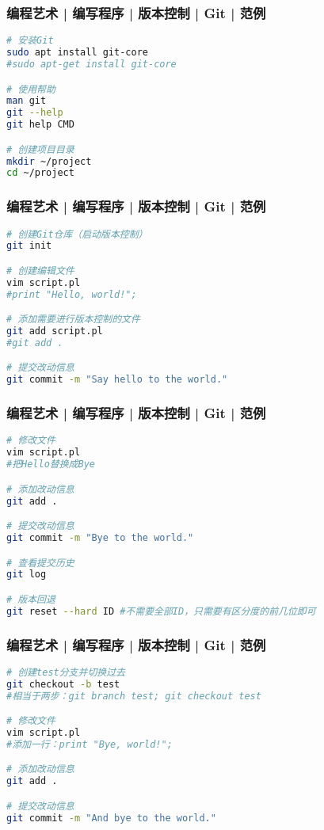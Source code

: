 \begin{frame}[fragile]
  \frametitle{编程艺术 | 编写程序 | 版本控制 | Git | \alert{范例}}
\begin{lstlisting}[language=sh]
# 安装Git
sudo apt install git-core
#sudo apt-get install git-core

# 使用帮助
man git
git --help
git help CMD

# 创建项目目录
mkdir ~/project
cd ~/project
\end{lstlisting}
\end{frame}

\begin{frame}[fragile]
  \frametitle{编程艺术 | 编写程序 | 版本控制 | Git | \alert{范例}}
\begin{lstlisting}[language=sh]
# 创建Git仓库（启动版本控制）
git init

# 创建编辑文件
vim script.pl
#print "Hello, world!";

# 添加需要进行版本控制的文件
git add script.pl
#git add .

# 提交改动信息
git commit -m "Say hello to the world."
\end{lstlisting}
\end{frame}

\begin{frame}[fragile]
  \frametitle{编程艺术 | 编写程序 | 版本控制 | Git | 范例}
\begin{lstlisting}[language=sh]
# 修改文件
vim script.pl
#把Hello替换成Bye

# 添加改动信息
git add .

# 提交改动信息
git commit -m "Bye to the world."

# 查看提交历史
git log

# 版本回退
git reset --hard ID #不需要全部ID，只需要有区分度的前几位即可
\end{lstlisting}
\end{frame}

\begin{frame}[fragile]
  \frametitle{编程艺术 | 编写程序 | 版本控制 | Git | \alert{范例}}
\begin{lstlisting}[language=sh]
# 创建test分支并切换过去
git checkout -b test
#相当于两步：git branch test; git checkout test

# 修改文件
vim script.pl
#添加一行：print "Bye, world!";

# 添加改动信息
git add .

# 提交改动信息
git commit -m "And bye to the world."
\end{lstlisting}
\end{frame}

